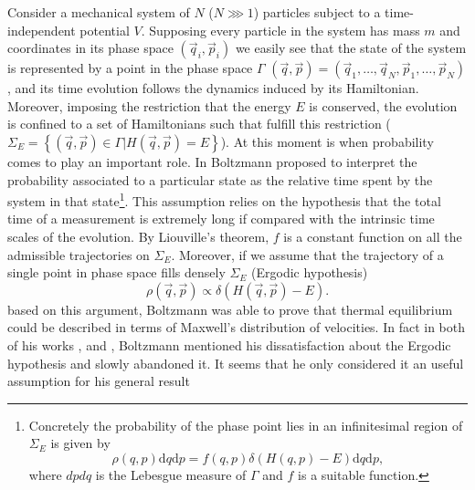Consider a mechanical system of $N$ ($N \ggg 1$) particles subject to a time-independent potential $V$. Supposing every particle in the system has mass $m$ and coordinates in its phase space $(\vec{q}_i,\vec{p}_i)$ we easily see that the state of the system is represented by a point in the phase space $\Gamma$ $(\vec{q},\vec{p})=(\vec{q}_{1},\ldots,\vec{q}_{N},\vec{p}_{1},\ldots,\vec{p}_{N})$, and its time evolution follows the dynamics induced by its Hamiltonian. Moreover, imposing the restriction that the energy $E$ is conserved, the evolution is confined to a set of Hamiltonians such that fulfill this restriction ($\Sigma_{E}=\left\{(\vec{q},\vec{p})\in \Gamma | H(\vec{q},\vec{p})=E\right\}$). At this moment is when probability comes to play an important role. In \cite{boltzmann_uber_1866} Boltzmann proposed to interpret the probability associated to a particular state as the relative time spent by the system in that state\footnote{ Concretely the probability of the phase point lies in an infinitesimal region of $\Sigma_E$ is given by 
\[\rho(q, p) \mathrm{d} q \mathrm{d} p=f(q, p) \delta(H(q, p)-E) \mathrm{d} q \mathrm{d} p,\]
where $dpdq$ is the Lebesgue measure of $\Gamma$ and $f$ is a suitable function.}. This assumption relies on the hypothesis that the total time of a measurement is extremely long if compared with the intrinsic time scales of the evolution.
\newline
By Liouville's theorem, $f$ is a constant function on all the admissible trajectories on $\Sigma_{E}$. Moreover, if we assume that the trajectory of a single point in phase space fills densely $\Sigma_E$ (Ergodic hypothesis)
\begin{equation}
\rho(\vec{q},\vec{p})\propto \delta(H(\vec{q},\vec{p})-E).
\label{CH1:Liouville_equation}
\end{equation}
based on this argument, Boltzmann was able to prove that thermal equilibrium could be described in terms of Maxwell's distribution of velocities.
\newline
In fact in both of his works \cite{boltzmann_zur_1871}, and \cite{boltzmann_einige_1871}, Boltzmann mentioned his dissatisfaction about the Ergodic hypothesis and slowly abandoned it. It seems that he only considered it an useful assumption for his general result
